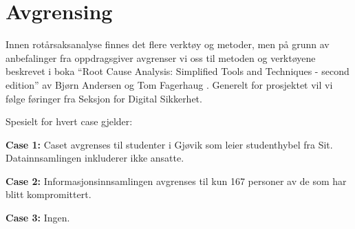\section{Avgrensing}
\label{sec:avgrensing}
Innen rotårsaksanalyse finnes det flere verktøy og metoder, men på grunn av anbefalinger fra oppdragsgiver avgrenser vi oss til metoden og verktøyene beskrevet i boka ``Root Cause Analysis: Simplified Tools and Techniques - second edition'' av Bjørn Andersen og Tom Fagerhaug \cite{RCA}. Generelt for prosjektet vil vi følge føringer fra Seksjon for Digital Sikkerhet.

\noindent Spesielt for hvert case gjelder:

\textbf{Case 1:}
Caset avgrenses til studenter i Gjøvik som leier studenthybel fra Sit. Datainnsamlingen inkluderer ikke ansatte. 

\textbf{Case 2:}
Informasjonsinnsamlingen avgrenses til kun 167 personer av de som har blitt kompromittert. 

\textbf{Case 3:}
Ingen.
